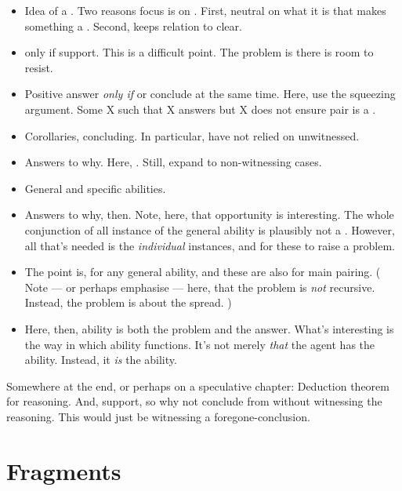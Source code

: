 \begin{note}
  \begin{itemize}
  \item
    Idea of a \fc{}.
    Two reasons focus is on \fc{}.
    First, neutral on what it is that makes something a \fc{}.
    Second, keeps relation to \qzS{} clear.
  \item
    \fc{} only if support.
    This is a difficult point.
    The problem is there is room to resist.
  \item
    Positive answer \emph{only if} \fc{} or conclude at the same time.
    Here, use the squeezing argument.
    Some X such that X answers but X does not ensure pair is a \fc{}.
  \item
    Corollaries, concluding.
    In particular, have not relied on unwitnessed.
  \item
    Answers to why.
    Here, .
    Still, expand to non-witnessing cases.
  \item
    General and specific abilities.
  \item
    Answers to why, then.
    Note, here, that opportunity is interesting.
    The whole conjunction of all instance of the general ability is plausibly not a \requ{}.
    However, all that's needed is the \emph{individual} instances, and for these to raise a problem.
  \item
    The point is,  for any general ability, and these are also  for main pairing.
    (%
    Note --- or perhaps emphasise --- here, that the problem is \emph{not} recursive.
    Instead, the problem is about the spread.%
    )
  \item
    Here, then, ability is both the problem and the answer.
    What's interesting is the way in which ability functions.
    It's not merely \emph{that} the agent has the ability.
    Instead, it \emph{is} the ability.
  \end{itemize}
\end{note}

\begin{note}
  Somewhere at the end, or perhaps on a speculative chapter:
  Deduction theorem for reasoning.
  And, support, so why not conclude from without witnessing the reasoning.
  This would just be witnessing a foregone-conclusion.
\end{note}

\section{Fragments}

